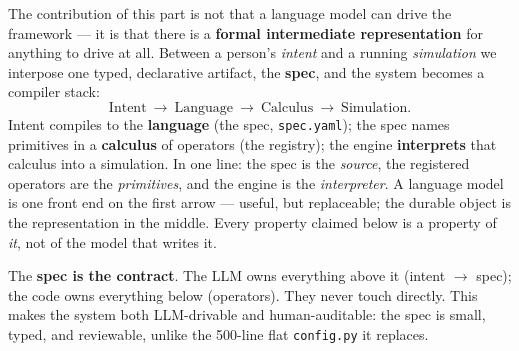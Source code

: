 \documentclass[11pt]{article}
\newcommand{\code}[1]{\texttt{#1}}
\begin{document}
The contribution of this part is not that a language model can drive the
framework --- it is that there is a \textbf{formal intermediate representation}
for anything to drive at all. Between a person's \emph{intent} and a running
\emph{simulation} we interpose one typed, declarative artifact, the \textbf{spec},
and the system becomes a compiler stack:
\[
\text{Intent}\ \longrightarrow\ \text{Language}\ \longrightarrow\ \text{Calculus}\ \longrightarrow\ \text{Simulation}.
\]
Intent compiles to the \textbf{language} (the spec, \code{spec.yaml}); the spec
names primitives in a \textbf{calculus} of operators (the registry); the engine
\textbf{interprets} that calculus into a simulation. In one line: the spec is the
\emph{source}, the registered operators are the \emph{primitives}, and the engine
is the \emph{interpreter}. A language model is one front end on the first arrow ---
useful, but replaceable; the durable object is the representation in the middle.
Every property claimed below is a property of \emph{it}, not of the model that
writes it.

\begin{center}
\end{center}

The \textbf{spec is the contract}. The LLM owns everything above it (intent $\to$
spec); the code owns everything below (operators). They never touch directly. This
makes the system both LLM-drivable and human-auditable: the spec is small, typed,
and reviewable, unlike the 500-line flat \code{config.py} it replaces.
\end{document}
